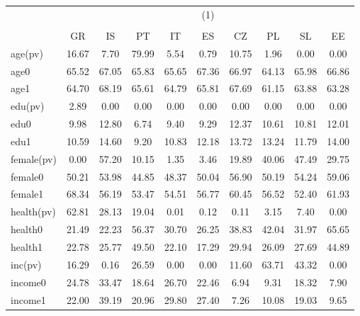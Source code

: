 {
\def\sym#1{\ifmmode^{#1}\else\(^{#1}\)\fi}
\begin{tabular}{l*{1}{ccccccccc}}
\hline\hline
          &\multicolumn{9}{c}{(1)}                                                                  \\
          &\multicolumn{9}{c}{}                                                                     \\
          &       GR&       IS&       PT&       IT&       ES&       CZ&       PL&       SL&       EE\\
\hline
age(pv)   &    16.67&     7.70&    79.99&     5.54&     0.79&    10.75&     1.96&     0.00&     0.00\\
age0      &    65.52&    67.05&    65.83&    65.65&    67.36&    66.97&    64.13&    65.98&    66.86\\
age1      &    64.70&    68.19&    65.61&    64.79&    65.81&    67.69&    61.15&    63.88&    63.28\\
edu(pv)   &     2.89&     0.00&     0.00&     0.00&     0.00&     0.00&     0.00&     0.00&     0.00\\
edu0      &     9.98&    12.80&     6.74&     9.40&     9.29&    12.37&    10.61&    10.81&    12.01\\
edu1      &    10.59&    14.60&     9.20&    10.83&    12.18&    13.72&    13.24&    11.79&    14.00\\
female(pv)&     0.00&    57.20&    10.15&     1.35&     3.46&    19.89&    40.06&    47.49&    29.75\\
female0   &    50.21&    53.98&    44.85&    48.37&    50.04&    56.90&    50.19&    54.24&    59.06\\
female1   &    68.34&    56.19&    53.47&    54.51&    56.77&    60.45&    56.52&    52.40&    61.93\\
health(pv)&    62.81&    28.13&    19.04&     0.01&     0.12&     0.11&     3.15&     7.40&     0.00\\
health0   &    21.49&    22.23&    56.37&    30.70&    26.25&    38.83&    42.04&    31.97&    65.65\\
health1   &    22.78&    25.77&    49.50&    22.10&    17.29&    29.94&    26.09&    27.69&    44.89\\
inc(pv)   &    16.29&     0.16&    26.59&     0.00&     0.00&    11.60&    63.71&    43.32&     0.00\\
income0   &    24.78&    33.47&    18.64&    26.70&    22.46&     6.94&     9.31&    18.32&     7.90\\
income1   &    22.00&    39.19&    20.96&    29.80&    27.40&     7.26&    10.08&    19.03&     9.65\\
\hline\hline
\end{tabular}
}
